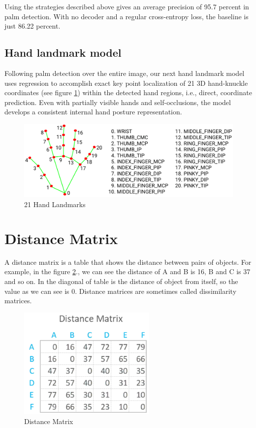 Using the strategies described above gives an average precision of 95.7 percent in palm detection. With no decoder and a regular cross-entropy loss, the baseline is just 86.22 percent.

\subsection{ Hand landmark model }
Following palm detection over the entire image, our next hand landmark model uses regression to accomplish exact key point localization of 21 3D hand-knuckle coordinates (see figure \ref{fig:Chap3-HandLandMark}) within the detected hand regions, i.e., direct, coordinate prediction. Even with partially visible hands and self-occlusions, the model develops a consistent internal hand posture representation.
\begin{figure}[H]
	\centering
	\includegraphics[width=\textwidth]{img/Chap3/HandLandMark}
	\caption{ 21 Hand Landmarks }
	\label{fig:Chap3-HandLandMark}
\end{figure}


\section{ Distance Matrix }
A distance matrix \cite{DistanceMatrix} is a table that shows the distance between pairs of objects.
For example, in the figure \ref{fig:Chap3-DM}., we can see the distance of A and B is 16, B and C is 37
and so on. In the diagonal of table is the distance of object from itself, so the value
as we can see is 0. Distance matrices are sometimes called dissimilarity matrices.

\begin{figure}[H]
	\centering
	\includegraphics[width=0.6\textwidth]{img/Chap3/DM}
	\caption{ Distance Matrix }
	\label{fig:Chap3-DM}
\end{figure}


